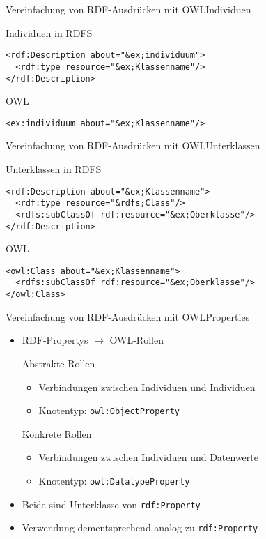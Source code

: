 \documentclass{beamer}
\begin{document}
\begin{frame}[fragile]{Vereinfachung von RDF-Ausdrücken mit
OWL}{Individuen}
\begin{block}{Individuen in RDFS}
\begin{lstlisting}[lang="xml"]
<rdf:Description about="&ex;individuum">
  <rdf:type resource="&ex;Klassenname"/>
</rdf:Description>
\end{lstlisting}
\end{block}
\begin{block}{OWL}
\begin{lstlisting}[lang="xml"]
<ex:individuum about="&ex;Klassenname"/>
\end{lstlisting}
\end{block}
\end{frame}

\begin{frame}[fragile]{Vereinfachung von RDF-Ausdrücken mit
OWL}{Unterklassen}
\begin{block}{Unterklassen in RDFS}
\begin{lstlisting}[lang="xml"]
<rdf:Description about="&ex;Klassenname">
  <rdf:type resource="&rdfs;Class"/>
  <rdfs:subClassOf rdf:resource="&ex;Oberklasse"/>
</rdf:Description>
\end{lstlisting}
\end{block}
\begin{block}{OWL}
\begin{lstlisting}[lang="xml"]
<owl:Class about="&ex;Klassenname">
  <rdfs:subClassOf rdf:resource="&ex;Oberklasse"/>
</owl:Class>
\end{lstlisting}
\end{block}

\end{frame}

\begin{frame}[fragile]{Vereinfachung von RDF-Ausdrücken mit OWL}{Properties}
\begin{itemize}
\item RDF-Propertys $\rightarrow$ OWL-Rollen
\begin{block}{Abstrakte Rollen}
\begin{itemize}
\item Verbindungen zwischen Individuen und Individuen
\item Knotentyp: \tt owl:ObjectProperty
\end{itemize}
\end{block}

\begin{block}{Konkrete Rollen}
\begin{itemize}
\item Verbindungen zwischen Individuen und Datenwerte
\item Knotentyp: \tt owl:DatatypeProperty
\end{itemize}
\end{block}

\item Beide sind Unterklasse von \texttt{rdf:Property}
\item Verwendung dementsprechend analog zu \texttt{rdf:Property}

\end{itemize}
\end{frame}
\end{document}

